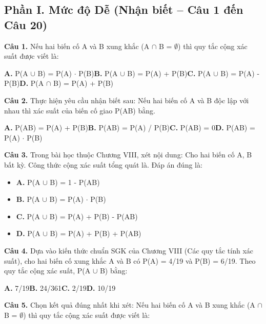 \documentclass[11pt,a4paper]{article}
\begin{document}
\subsection*{\color{accent} Phần I. Mức độ Dễ (Nhận biết -- Câu 1 đến Câu 20)}
\textbf{\color{primary} Câu 1.} Nếu hai biến cố A và B xung khắc (A $\cap$ B = $\emptyset$) thì quy tắc cộng xác suất được viết là:\par
\hspace*{1.5em}\textbf{A.} P(A $\cup$ B) = P(A) $\cdot$ P(B)\quad\quad \textbf{B.} P(A $\cup$ B) = P(A) + P(B)\quad\quad \textbf{C.} P(A $\cup$ B) = P(A) - P(B)\quad\quad \textbf{D.} P(A $\cap$ B) = P(A) + P(B)\par\vspace{2pt}
\textbf{\color{primary} Câu 2.} Thực hiện yêu cầu nhận biết sau: Nếu hai biến cố A và B độc lập với nhau thì xác suất của biến cố giao P(AB) bằng.\par
\hspace*{1.5em}\textbf{A.} P(AB) = P(A) + P(B)\quad\quad \textbf{B.} P(AB) = P(A) / P(B)\quad\quad \textbf{C.} P(AB) = 0\quad\quad \textbf{D.} P(AB) = P(A) $\cdot$ P(B)\par\vspace{2pt}
\textbf{\color{primary} Câu 3.} Trong bài học thuộc Chương VIII, xét nội dung: Cho hai biến cố A, B bất kỳ. Công thức cộng xác suất tổng quát là. Đáp án đúng là:\par
\begin{itemize}\setlength{\itemsep}{1pt}\setlength{\parskip}{0pt}
  \item[] \textbf{A.} P(A $\cup$ B) = 1 - P(AB)
  \item[] \textbf{B.} P(A $\cup$ B) = P(A) $\cdot$ P(B)
  \item[] \textbf{C.} P(A $\cup$ B) = P(A) + P(B) - P(AB)
  \item[] \textbf{D.} P(A $\cup$ B) = P(A) + P(B) + P(AB)
\end{itemize}\vspace{2pt}
\textbf{\color{primary} Câu 4.} Dựa vào kiến thức chuẩn SGK của Chương VIII (Các quy tắc tính xác suất), cho hai biến cố xung khắc A và B có P(A) = 4/19 và P(B) = 6/19. Theo quy tắc cộng xác suất, P(A $\cup$ B) bằng:\par
\hspace*{1.5em}\textbf{A.} 7/19\quad\quad \textbf{B.} 24/361\quad\quad \textbf{C.} 2/19\quad\quad \textbf{D.} 10/19\par\vspace{2pt}
\textbf{\color{primary} Câu 5.} Chọn kết quả đúng nhất khi xét: Nếu hai biến cố A và B xung khắc (A $\cap$ B = $\emptyset$) thì quy tắc cộng xác suất được viết là:\par
\end{document}
